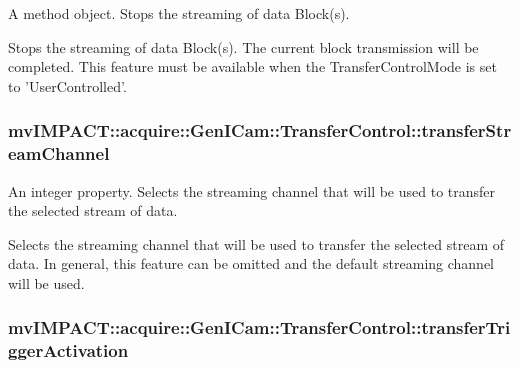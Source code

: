 A method object. Stops the streaming of data Block(s). 

Stops the streaming of data Block(s). The current block transmission will be completed. This feature must be available when the Transfer\+Control\+Mode is set to 'User\+Controlled'. \hypertarget{classmv_i_m_p_a_c_t_1_1acquire_1_1_gen_i_cam_1_1_transfer_control_a259c2a03c6badc8847ac855f2124f75e}{
\subsubsection[{transfer\+Stream\+Channel}]{ mv\+I\+M\+P\+A\+C\+T\+::acquire\+::\+Gen\+I\+Cam\+::\+Transfer\+Control\+::transfer\+Stream\+Channel}}\label{classmv_i_m_p_a_c_t_1_1acquire_1_1_gen_i_cam_1_1_transfer_control_a259c2a03c6badc8847ac855f2124f75e}


An integer property. Selects the streaming channel that will be used to transfer the selected stream of data. 

Selects the streaming channel that will be used to transfer the selected stream of data. In general, this feature can be omitted and the default streaming channel will be used. \hypertarget{classmv_i_m_p_a_c_t_1_1acquire_1_1_gen_i_cam_1_1_transfer_control_a3ec905c1aff4292f8f973bcb77cf2f42}{
\subsubsection[{transfer\+Trigger\+Activation}]{ mv\+I\+M\+P\+A\+C\+T\+::acquire\+::\+Gen\+I\+Cam\+::\+Transfer\+Control\+::transfer\+Trigger\+Activation}}\label{classmv_i_m_p_a_c_t_1_1acquire_1_1_gen_i_cam_1_1_transfer_control_a3ec905c1aff4292f8f973bcb77cf2f42}


